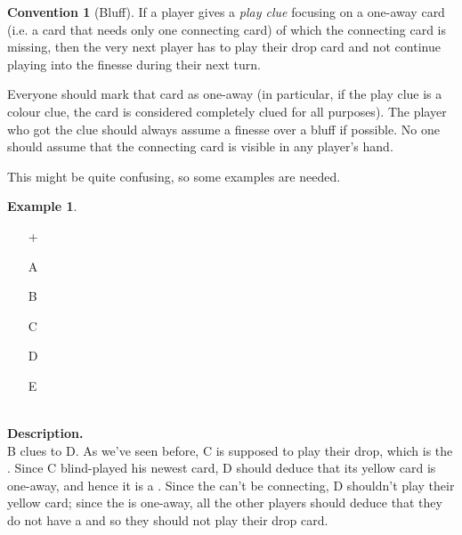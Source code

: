 \documentclass[a4paper]{article}
\theoremstyle{plain}
\theoremstyle{definition}
\newtheorem{example}[theorem]{Example}
\newtheorem{convention}[theorem]{Convention}
\begin{document}
\begin{convention}[Bluff]
	\label{bluff}
	If a player gives a \emph{play clue} focusing on a one-away card (i.e. a card that needs only one connecting card) of which the connecting card is missing, then the very next player has to play their drop card and not continue playing into the finesse during their next turn.
	
	Everyone should mark that card as one-away (in particular, if the play clue is a colour clue, the card is considered completely clued for all purposes). The player who got the clue should always assume a finesse over a bluff if possible. No one should assume that the connecting card is visible in any player's hand.
\end{convention}

This might be quite confusing, so some examples are needed.

\begin{example}
	\label{ex:bluff}
	\hfill \\
	\begin{minipage}{0.45\textwidth}
		\begin{itemize}
			\item[\Large +]      
			\item[\Large A]    
			\item[\Large B]    
			\item[\Large C]    
			\item[\Large D]    
			\item[\Large E]    
		\end{itemize}
	\end{minipage}%
	\begin{minipage}{0.55\textwidth}
		\hfill \\
		
		\textbf{Description.} \\
		
		B clues  to D. As we've seen before, C is supposed to play their drop, which is the . Since C blind-played his newest card, D should deduce that its yellow card is one-away, and hence it is a . Since the  can't be connecting, D shouldn't play their yellow card; since the  is one-away, all the other players should deduce that they do not have a  and so they should not play their drop card.
	\end{minipage}
\end{example} \vspace{0.15 cm}
\end{document}
